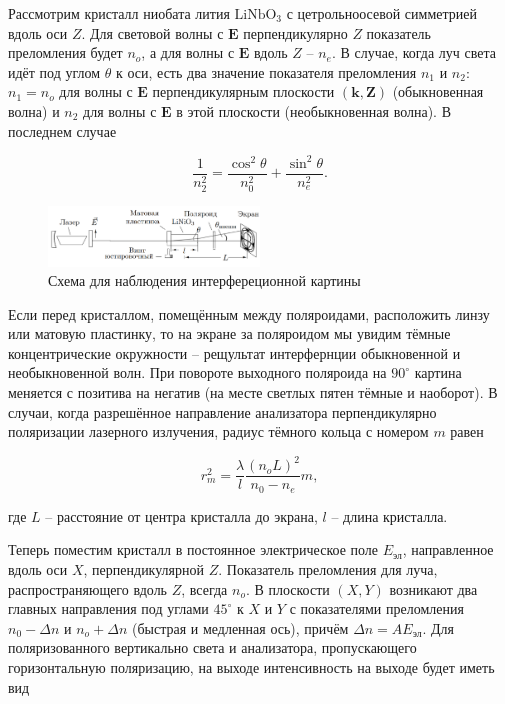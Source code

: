 \documentclass[a4paper,12pt]{article} %
\begin{document}
\noindent Рассмотрим кристалл ниобата лития $\text{LiNbO}_3$ с цетрольноосевой симметрией вдоль оси $Z$. Для световой волны с $\mathbf{E}$ перпендикулярно $Z$ показатель преломления будет $n_o$, а для волны с $\mathbf{E}$ вдоль $Z$ -- $n_e$. В случае, когда луч света идёт под углом $\theta$ к оси, есть два значение показателя преломления $n_1$ и $n_2$: $n_1 = n_o$ для волны с $\mathbf{E}$ перпендикулярным плоскости $(\mathbf{k},\mathbf{Z})$ (обыкновенная волна) и $n_2$ для волны с $\mathbf{E}$ в этой плоскости (необыкновенная волна). В последнем случае

\begin{equation}
\dfrac{1}{n_2^2}=\dfrac{\cos^2 \theta}{n_0^2}+\dfrac{\sin^2 \theta}{n_e^2}.
\end{equation}

\begin{figure}
\begin{center}
\includegraphics[width = 0.5\textwidth]{1.png}
\end{center}

\caption{Схема для наблюдения интерфереционной картины}
\end{figure}

\noindent Если перед кристаллом, помещённым между поляроидами, расположить линзу или матовую пластинку, то на экране за поляроидом мы увидим тёмные концентрические окружности -- рещультат интерфернции обыкновенной и необыкновенной волн. При повороте выходного поляроида на $90^\circ$ картина меняется с позитива на негатив (на месте светлых пятен тёмные и наоборот). В случаи, когда разрешённое направление анализатора перпендикулярно поляризации лазерного излучения, радиус тёмного кольца с номером $m$ равен

\begin{equation}
r_m^2 = \dfrac{\lambda}{l} \dfrac{(n_oL)^2}{n_0 - n_e}m,
\end{equation}

\noindent где $L$ -- расстояние от центра кристалла до экрана, $l$ -- длина кристалла.\\

\medskip

\noindent Теперь поместим кристалл в постоянное электрическое поле $E_{\text{эл}}$, направленное вдоль оси $X$, перпендикулярной $Z$. Показатель преломления для луча, распространяющего вдоль $Z$, всегда $n_o$. В плоскости $(X,Y)$ возникают два главных направления под углами $45^\circ$ к $X$ и $Y$ с показателями преломления $n_0 - \Delta n$ и $n_o + \Delta n$ (быстрая и медленная ось), причём $\Delta n = A E_{\text{эл}}$. Для поляризованного вертикально света и анализатора, пропускающего горизонтальную поляризацию, на выходе интенсивность на выходе будет иметь вид
\end{document}
